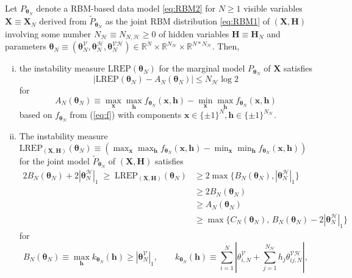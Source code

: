\documentclass[numbib]{imamat}
\theoremstyle{theorem}
\theoremstyle{lemma}
\theoremstyle{example}
\theoremstyle{corollary}
\theoremstyle{definition}
\theoremstyle{remark}
\theoremstyle{approximation}
\theoremstyle{scheme}
\newcommand{\REP}{\mathrm{LREP}}
\newcommand{\elt}{A_{N}(\boldsymbol \theta_N) }
\newcommand{\Gam}{B_{N}(\boldsymbol \theta_N) }
\newcommand{\Gamc}{C_{N}(\boldsymbol \theta_N) }
\begin{document}
\protect\hypertarget{prp:prop2}{}{\label{prp:prop2} }Let
\(P_{\boldsymbol \theta_N}\) denote a RBM-based data model \eqref{eq:RBM2}
for \(N\geq 1\) visible variables
\(\boldsymbol X \equiv \boldsymbol X_N\) derived from
\(\tilde{P}_{\boldsymbol \theta_N}\) as the joint RBM distribution
\eqref{eq:RBM1} of \((\boldsymbol X, \boldsymbol H)\) involving some
number \(N_{\mathcal{H}} \equiv N_{N,\mathcal{H}}\geq 0\) of hidden
variables \(\boldsymbol H \equiv \boldsymbol H_N\) and parameters
\(\boldsymbol \theta_N \equiv (\boldsymbol \theta_N^{\mathcal{V}},\boldsymbol \theta_N^{\mathcal{H}}, \boldsymbol \theta_N^{\mathcal{VH}}) \in\mathbb{R}^{N}\times \mathbb{R}^{N_{\mathcal{H}}} \times \mathbb{R}^{N*N_{\mathcal{H}}}\).
Then,
\begin{enumerate}[(i)]
\item the instability measure $\REP(\boldsymbol \theta_N)$ for the marginal model $P_{\boldsymbol \theta_N}$ of  $\boldsymbol X$ satisfies
    $$
    \left| \REP(\boldsymbol \theta_N)  - \elt\right| \leq    N_{\mathcal{H}}  \log 2
    $$
    for
    $$
    \elt  \equiv   \max_{ \boldsymbol x} \max_{ \boldsymbol h  } f_{\boldsymbol \theta_N} (\boldsymbol x, \boldsymbol h)-\min_{ \boldsymbol x } \max_{ \boldsymbol h }f_{\boldsymbol \theta_N} (\boldsymbol x, \boldsymbol h)
    $$
    based on $f_{\boldsymbol \theta_N}$ from (\ref{eq:f}) with components $\boldsymbol x \in \{\pm 1\}^{N}, \boldsymbol h \in \{\pm 1\}^{N_{\mathcal{H}}}$.
\item The instability measure $\REP_{(\boldsymbol X, \boldsymbol H)}(\boldsymbol \theta_N)\equiv \left(\max_{ \boldsymbol x} \max_{ \boldsymbol h  } f_{\boldsymbol \theta_N} (\boldsymbol x, \boldsymbol h)-\min_{ \boldsymbol x } \min_{ \boldsymbol h }f_{\boldsymbol \theta_N} (\boldsymbol x, \boldsymbol h)\right)$ for the joint model $\tilde{P}_{\boldsymbol \theta_N}$ of $(\boldsymbol X, \boldsymbol H)$ satisfies
    \begin{align*}
    2\Gam +  2|\boldsymbol \theta_N^{\mathcal{H}} |_{1} \; \geq \; \REP_{(\boldsymbol X, \boldsymbol H)}(\boldsymbol \theta_N)    & \geq 
    2\max\big\{\Gam,   |\boldsymbol \theta_N^{\mathcal{H}} |_{1}\big\} \\
    &\geq  2\Gam\\
    &\geq  \elt\\
    &\geq   \max\big\{  \Gamc, \, \Gam  - 2|\boldsymbol \theta_N^{\mathcal{H}} |_{1}  \big\}
    \end{align*}
    for
    $$
    \Gam \equiv \max_{ \boldsymbol h} k_{\boldsymbol \theta_N} (\boldsymbol h)
    \geq  |\boldsymbol \theta_N^{\mathcal{V}} |_{1},\qquad  k_{\boldsymbol \theta_N} (\boldsymbol h)  \equiv \sum_{i=1}^{N }\left| \theta_{i,N}^{\mathcal{V}}   + \sum_{j=1}^{N_{\mathcal{H}}} h_j \theta_{ij,N}^{\mathcal{VH}} \right|,
$$
\end{enumerate}
\end{document}
